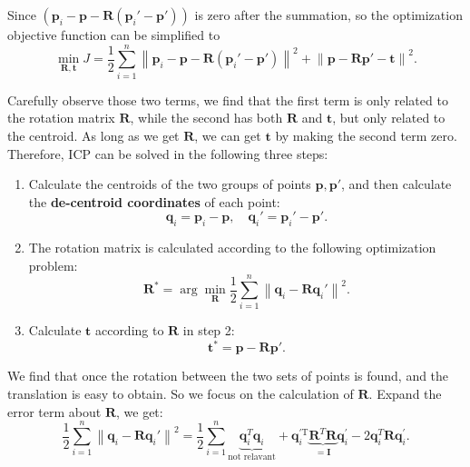 Since $\left( {{\mathbf{p}_i} - \mathbf{p} - \mathbf{R}\left( {{\mathbf{p}_i}' - \mathbf{p}'} \right)} \right)$ is zero after the summation, so the optimization objective function can be simplified to
\begin{equation}
\mathop {\min }\limits_{\mathbf{R}, \mathbf{t}} J = \frac{1}{2}\sum\limits_{i = 1}^n {{\left\| {{\mathbf{p}_i} - \mathbf{p} - \mathbf{R}\left( {{\mathbf{p}_i}' - \mathbf{p}'} \right)} \right\|}^2} + {{\left\| {\mathbf{p} - \mathbf{Rp}' - \mathbf{t}} \right\|}^2} .
\end{equation}

Carefully observe those two terms, we find that the first term is only related to the rotation matrix $\mathbf{R}$, while the second has both $\mathbf{R}$ and $\mathbf{t}$, but only related to the centroid. As long as we get $\mathbf{R}$, we can get $\mathbf{t}$ by making the second term zero. Therefore, ICP can be solved in the following three steps:

\begin{mdframed}
\begin{enumerate}
	\item Calculate the centroids of the two groups of points $\mathbf{p}, \mathbf{p}'$, and then calculate the \textbf{de-centroid coordinates} of each point:
	\[
	\mathbf{q}_i = \mathbf{p}_i - \mathbf{p}, \quad \mathbf{q}_i' = \mathbf{p}_i' - \mathbf{p}'.
	\]
	\item The rotation matrix is calculated according to the following optimization problem:
	\begin{equation}
		\mathbf{R}^* = \arg \mathop {\min }\limits_{\mathbf{R}} \frac{1}{2}\sum\limits_{i = 1}^n {{\left\| {{\mathbf{q}_i} - \mathbf{R} \mathbf{q}_i' } \right\|}^2}.
	\end{equation}
	\item Calculate $\mathbf{t}$ according to $\mathbf{R}$ in step 2:
	\begin{equation}
	\label{eq:pnp-solve-t}
	\mathbf{t}^* = \mathbf{p} - \mathbf{R} \mathbf{p}'.
	\end{equation}
\end{enumerate}
\end{mdframed}

We find that once the rotation between the two sets of points is found, and the translation is easy to obtain. So we focus on the calculation of $\mathbf{R}$. Expand the error term about $\mathbf{R}$, we get:
\begin{equation}
 \frac{1}{2}\sum\limits_{i = 1}^n \left\| {{\mathbf{q}_i} - \mathbf{R} \mathbf{q}_i' } \right\|^2 = \frac{1}{2}\sum\limits_{i = 1}^n \underbrace{\mathbf{q}_i^T \mathbf{q}_i}_{\text{not relavant}} + \mathbf{q}_i^{ \prime \mathrm{T}} \underbrace{\mathbf{R}^T \mathbf{R}}_{=\mathbf{I}} \mathbf{q}^\prime_i - 2\mathbf{q}_i^T \mathbf{R} \mathbf{q}^\prime_i.
\end{equation}

